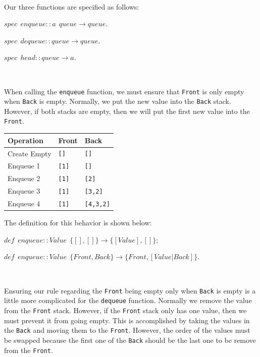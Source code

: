 \documentclass[
]{book}
\begin{document}
\(\nonumber\)

Our three functions are specified as follows:

\begin{formulabox}
\(spec ~ ~ enqueue :: a ~ ~ queue \rightarrow queue.\)

\(spec ~ ~ dequeue :: queue \rightarrow queue.\)

\(spec ~ ~ head :: queue \rightarrow a.\)

\end{formulabox}

\(\nonumber\)

When calling the \texttt{enqueue} function, we must ensure that \texttt{Front} is only empty when \texttt{Back} is empty. Normally, we put the new value into the \texttt{Back} stack. However, if both stacks are empty, then we will put the first new value into the \texttt{Front}.

\begin{longtable}[]{@{}lll@{}}
\toprule
Operation & Front & Back \\
\midrule
\endhead
Create Empty & \texttt{{[}{]}} & \texttt{{[}{]}} \\
Enqueue 1 & \texttt{{[}1{]}} & \texttt{{[}{]}} \\
Enqueue 2 & \texttt{{[}1{]}} & \texttt{{[}2{]}} \\
Enqueue 3 & \texttt{{[}1{]}} & \texttt{{[}3,2{]}} \\
Enqueue 4 & \texttt{{[}1{]}} & \texttt{{[}4,3,2{]}} \\
\bottomrule
\end{longtable}

The definition for this behavior is shown below:

\begin{formulabox}
\(de\mathit{f} ~ ~ enqueue :: Value ~ ~ \lbrace [], [] \rbrace \rightarrow \lbrace [Value], [] \rbrace;\)

\(de\mathit{f} ~ ~ enqueue :: Value ~ ~ \lbrace Front, Back \rbrace \rightarrow \lbrace Front, [Value|Back] \rbrace.\)

\end{formulabox}

\(\nonumber\)

Ensuring our rule regarding the \texttt{Front} being empty only when \texttt{Back} is empty is a little more complicated for the \texttt{dequeue} function. Normally we remove the value from the \texttt{Front} stack. However, if the \texttt{Front} stack only has one value, then we must prevent it from going empty. This is accomplished by taking the values in the \texttt{Back} and moving them to the \texttt{Front}. However, the order of the values must be swapped because the first one of the \texttt{Back} should be the last one to be remove from the \texttt{Front}.
\end{document}
